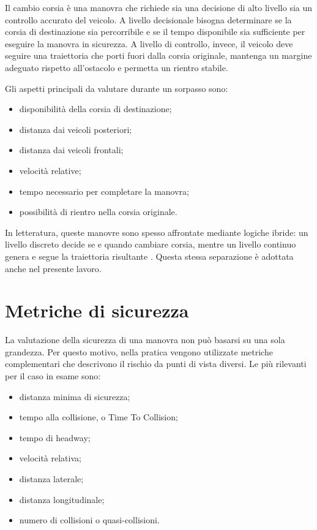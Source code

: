 Il cambio corsia è una manovra che richiede sia una decisione di alto livello sia un controllo accurato del veicolo. A livello decisionale bisogna determinare se la corsia di destinazione sia percorribile e se il tempo disponibile sia sufficiente per eseguire la manovra in sicurezza. A livello di controllo, invece, il veicolo deve seguire una traiettoria che porti fuori dalla corsia originale, mantenga un margine adeguato rispetto all'ostacolo e permetta un rientro stabile.

Gli aspetti principali da valutare durante un sorpasso sono:

\begin{itemize}
    \item disponibilità della corsia di destinazione;
    \item distanza dai veicoli posteriori;
    \item distanza dai veicoli frontali;
    \item velocità relative;
    \item tempo necessario per completare la manovra;
    \item possibilità di rientro nella corsia originale.
\end{itemize}

In letteratura, queste manovre sono spesso affrontate mediante logiche ibride: un livello discreto decide se e quando cambiare corsia, mentre un livello continuo genera e segue la traiettoria risultante \cite{paden2016survey}. Questa stessa separazione è adottata anche nel presente lavoro.

\section{Metriche di sicurezza}

La valutazione della sicurezza di una manovra non può basarsi su una sola grandezza. Per questo motivo, nella pratica vengono utilizzate metriche complementari che descrivono il rischio da punti di vista diversi. Le più rilevanti per il caso in esame sono:

\begin{itemize}
    \item distanza minima di sicurezza;
    \item tempo alla collisione, o Time To Collision;
    \item tempo di headway;
    \item velocità relativa;
    \item distanza laterale;
    \item distanza longitudinale;
    \item numero di collisioni o quasi-collisioni.
\end{itemize}

